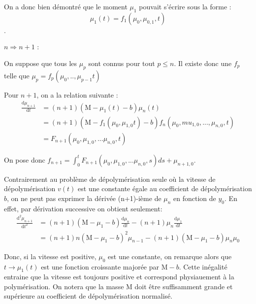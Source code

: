 \documentclass[a4paper]{article}
\newcommand{\mass}{\mathrm{M}}
\newcommand{\dep}{b}
\begin{document}
\begin{preuve}
	On a donc bien démontré que le moment $\mu_1$ pouvait s'écrire sous la forme :
	\[\mu_1(t) = f_1(\mu_0,\mu_{0,1},t)\].
	
	\vspace{0.5cm}
	
	\underline{$n 	\Rightarrow n+1$} :
	
	On suppose que tous les $\mu_p$ sont connus pour tout $p \leq n$. 
	Il existe donc une $f_p$ telle que $\mu_p = f_p(\mu_0,..,\mu_{p-1}t)$
	
	Pour $n+1$, on a la relation suivante :
	\[ 
	\begin{split}
	\frac{\mathrm{d} \mu_{n+1} }{\mathrm{d}t} &= (n+1)(\mass - \mu_1(t) - \dep)\mu_{n}(t) \\
	                                          &= (n+1)(\mass - f_1(\mu_0, \mu_{1,0}t) - \dep)f_{n}(\mu_0,mu_{1,0},...,\mu_{n,0},t) \\
	                                          &= F_{n+1}(\mu_0, \mu_{1,0},...\mu_{n,0}, t)
	\end{split}									
	\]
	
	On pose donc $f_{n+1} = \int_0^t F_{n+1}(\mu_0, \mu_{1,0},...\mu_{n,0}, s)ds + \mu_{n+1,0}$.
	
\end{preuve}


\begin{remarque}
Contrairement au problème de dépolymérisation seule où la vitesse de dépolymérisation $v(t)$
est une constante égale au coefficient de dépolymérisation $\dep$, 
on ne peut pas exprimer la dérivée (n+1)-ième de $\mu_n$ en fonction de $y_0$.
En effet, par dérivation successive on obtient seulement:
	\[ 
	\begin{split}
	\frac{\mathrm{d}^2 \mu_{n+1} }{\mathrm{d}t^2} &=  (n+1) (\mass - \mu_1 - \dep) \frac{\mathrm{d} \mu_{n} }{\mathrm{d}t}  
	                                                 - (n+1) \mu_n \frac{\mathrm{d} \mu_{1} }{\mathrm{d}t} \\
												  &= (n+1)n (\mass - \mu_1 - \dep)^2 \mu_{n-1} - (n+1)(\mass - \mu_1 - \dep)\mu_n\mu_0 
	\end{split}
	\]
\end{remarque}

Donc, si la vitesse est positive, $\mu_0$ est une constante,
on remarque alors que $t \to \mu_1(t)$ est une fonction croissante majorée par $\mass-\dep$. 
Cette inégalité entraine que la vitesse est toujours positive et correspond physiauement à la polymérisation.
On notera que la masse $\mass$ doit être suffisamment grande et supérieure au coefficient de dépolymérisation normalisé.
\end{document}
